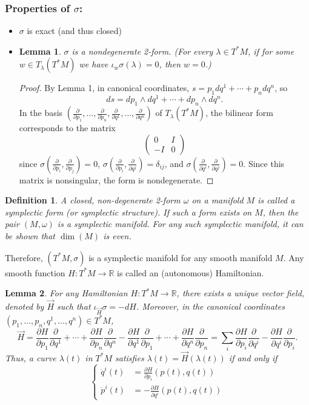 \documentclass{article}
\newcommand{\R}{\mathbb R}
\newcommand{\nl}{\newline\newline\noindent}
\newcommand{\w}{\omega}
\newcommand{\pd}[1]{\frac{\partial}{\partial #1}}
\newcommand{\pdof}[2]{\frac{\partial #1}{\partial #2}}
\newtheorem{defn}{Definition}
\newtheorem{lm}{Lemma}
\begin{document}
\subsubsection*{Properties of $\sigma$:}
\begin{itemize}
    \item $\sigma$ is exact (and thus closed)
    \item \begin{lm}
        $\sigma$ is a nondegenerate 2-form. (For every $\lambda\in T^*M$, if for some $w\in T_\lambda(T^*M)$ we have $\iota_w\sigma(\lambda)=0$, then $w=0$.)
    \end{lm}
    \begin{proof}
        By Lemma 1, in canonical coordinates, $s = p_1dq^1 + \cdots + p_ndq^n$, so
        \[ds = dp_1\wedge dq^1 + \cdots + dp_n\wedge dq^n.\]
        In the basis $\left(\pd{p_1},\dots,\pd{p_n},\pd{q^1},\dots,\pd{q^n}\right)$ of $T_\lambda(T^*M)$, the bilinear form corresponds to the matrix
        \[\left(\begin{array}{c|c}
            0 & I \\
            \hline
            -I & 0
        \end{array}\right)\]
        since $\sigma(\pd{p_i},\pd{p_j}) = 0$, $\sigma(\pd{p_i},\pd{q^j}) = \delta_{ij}$, and $\sigma(\pd{q^i},\pd{q^j}) = 0$. Since this matrix is nonsingular, the form is nondegenerate.
    \end{proof}
\end{itemize}
\begin{defn}
     A closed, non-degenerate 2-form $\w$ on a manifold $M$ is called a symplectic form (or symplectic structure). If such a form exists on $M$, then the pair $(M,\w)$ is a symplectic manifold. For any such symplectic manifold, it can be shown that $\dim(M)$ is even.
\end{defn}
Therefore, $(T^*M,\sigma)$ is a symplectic manifold for any smooth manifold $M$.
\nl
Any smooth function $H:T^*M\to\R$ is called an (autonomous) Hamiltonian.
\begin{lm}
    For any Hamiltonian $H:T^*M\to \R$, there exists a unique vector field, denoted by $\vec{H}$ such that $\iota_{\vec H} \sigma = -dH$. Moreover, in the canonical coordinates $(p_1,\dots, p_n,q^1,\dots,q^n)\in T^*M$,
    \[\vec H = \pdof{H}{p_1}\pd{q^1}+\cdots + \pdof{H}{p_n}\pd{q^n} - \pdof{H}{q^1}\pd{p_1}+\cdots + \pdof{H}{q^n}\pd{p_n} = \sum_{i} \pdof{H}{p_i}\pd{q^i} - \pdof{H}{q^i}\pd{p_i}.\]
    Thus, a curve $\lambda(t)$ in $T^*M$ satisfies $\lambda(t) = \vec H(\lambda(t))$ if and only if 
    \[\left\{\begin{aligned}
        \dot q^i(t) &= \pdof{H}{p_i}(p(t), q(t))\\
        \dot p^i(t) &= -\pdof{H}{q^i}(p(t), q(t))
    \end{aligned}\right.\]
\end{lm}
\end{document}
